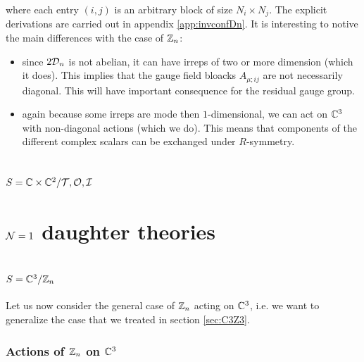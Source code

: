         where each entry $(i,j)$ is an arbitrary block of size $N_i\times N_j$. The explicit derivations are carried out in appendix \ref{app:invconfDn}. It is interesting to notive the main differences with the case of $\mathbb{Z}_n$:
        \begin{itemize}
            \item since $2\mathcal{D}_n$ is not abelian, it can have irreps of two or more dimension (which it does). This implies that the gauge field bloacks $A_{\mu;ij}$ are not necessarily diagonal. This will have important consequence for the residual gauge group.
            \item again because some irreps are mode then $1$-dimensional, we can act on $\mathbb{C}^3$ with non-diagonal actions (which we do). This means that components of the different complex scalars can be exchanged under $R$-symmetry.
        \end{itemize}
        

    \subsection{$S=\mathbb{C}\times\mathbb{C}^2/\mathcal{T},\mathcal{O},\mathcal{I}$}





\section{$\mathcal{N}=1$ daughter theories}

    \subsection{$S=\mathbb{C}^3/\mathbb{Z}_n$}

        Let us now consider the general case of $\mathbb{Z}_n$ acting on $\mathbb{C}^3$, i.e. we want to generalize the case that we treated in section \ref{sec:C3Z3}. 
        
        \subsubsection{Actions of $\mathbb{Z}_n$ on $\mathbb{C}^3$}
        
